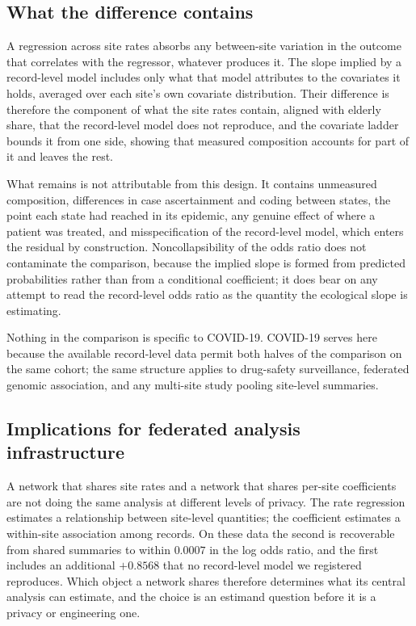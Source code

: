 \documentclass[11pt]{article}
\begin{document}
\subsection{What the difference contains}
\label{sec:why}

A regression across site rates absorbs any between-site variation in the
outcome that correlates with the regressor, whatever produces it.  The
slope implied by a record-level model includes only what that model
attributes to the covariates it holds, averaged over each site's own
covariate distribution.  Their difference is therefore the component
of what the site rates contain, aligned with elderly share, that the
record-level model does not reproduce, and
the covariate ladder bounds it from one side, showing that measured
composition accounts for part of it and leaves the rest.

What remains is not attributable from this design.  It contains
unmeasured composition, differences in case ascertainment and coding
between states, the point each state had reached in its epidemic, any
genuine effect of where a patient was treated, and misspecification of
the record-level model, which enters the residual by construction.
Noncollapsibility of the odds ratio
\cite{greenland1999noncollapsibility} does not contaminate the
comparison, because the implied slope is formed from predicted
probabilities rather than from a conditional coefficient; it does bear
on any attempt to read the record-level odds ratio as the quantity the
ecological slope is estimating.

Nothing in the comparison is specific to COVID-19.  COVID-19 serves
here because the available record-level data permit both halves of the
comparison on the same cohort; the same structure applies to drug-safety
surveillance, federated genomic association, and any multi-site study
pooling site-level summaries.

\subsection{Implications for federated analysis infrastructure}

A network that shares site rates and a network that shares per-site
coefficients are not doing the same analysis at different levels of
privacy.  The rate regression estimates a relationship between
site-level quantities; the coefficient estimates a within-site
association among records.  On these data the second is recoverable from
shared summaries to within $0.0007$ in the log odds ratio, and the
first includes an additional $+0.8568$ that no record-level model we
registered reproduces.  Which object a network shares therefore
determines what its central analysis can estimate, and the choice is an
estimand question before it is a privacy or engineering one.
\end{document}
